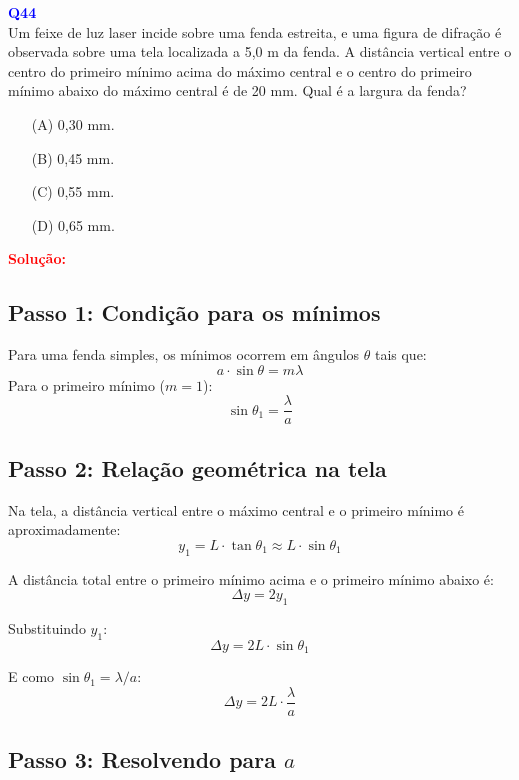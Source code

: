 \documentclass[a4paper,12pt]{article}
\begin{document}
\begin{flushleft}
\textbf{\textcolor{blue}{\Large Q44}}\\
\noindent
Um feixe de luz laser incide sobre uma fenda estreita, e uma
figura de difração é observada sobre uma tela localizada a 5,0 m
da fenda. A distância vertical entre o centro do primeiro mínimo
acima do máximo central e o centro do primeiro mínimo abaixo
do máximo central é de 20 mm. Qual é a largura da fenda?

\begin{itemize}
\item[(A)] 0,30 mm.
\item[(B)] 0,45 mm.
\item[(C)] 0,55 mm.
\item[(D)] 0,65 mm.
\end{itemize}

\vspace{0.5cm}

\textcolor{red}{\textbf{Solução:}}\\

\subsection*{Passo 1: Condição para os mínimos}

Para uma fenda simples, os mínimos ocorrem em ângulos \(\theta\) tais que:
\[
a \cdot \sin\theta = m\lambda
\]
Para o primeiro mínimo (\(m=1\)):
\[
\sin\theta_1 = \frac{\lambda}{a}
\]

\vspace{0.5cm}

\subsection*{Passo 2: Relação geométrica na tela}

Na tela, a distância vertical entre o máximo central e o primeiro mínimo é aproximadamente:
\[
y_1 = L \cdot \tan\theta_1 \approx L \cdot \sin\theta_1
\]

A distância total entre o primeiro mínimo acima e o primeiro mínimo abaixo é:
\[
\Delta y = 2y_1
\]

Substituindo \(y_1\):
\[
\Delta y = 2L \cdot \sin\theta_1
\]

E como \(\sin\theta_1 = \lambda/a\):
\[
\Delta y = 2L \cdot \frac{\lambda}{a}
\]

\vspace{0.5cm}

\subsection*{Passo 3: Resolvendo para \(a\)}


\end{flushleft}
\end{document}
